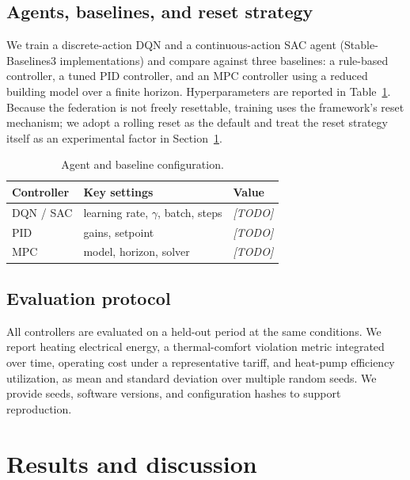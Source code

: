\documentclass[preprint,review,12pt]{elsarticle}
\begin{document}
\subsection{Agents, baselines, and reset strategy}
We train a discrete-action DQN and a continuous-action SAC agent (Stable-Baselines3
implementations) and compare against three baselines: a rule-based controller, a
tuned PID controller, and an MPC controller using a reduced building model over a
finite horizon. Hyperparameters are reported in Table~\ref{tab:hparams}. Because
the federation is not freely resettable, training uses the framework's reset
mechanism; we adopt a rolling reset as the default and treat the reset strategy
itself as an experimental factor in Section~\ref{sec:results}.

\begin{table}[t]\centering
\caption{Agent and baseline configuration.}
\label{tab:hparams}
\small
\begin{tabular}{@{}lll@{}}
\toprule
Controller & Key settings & Value \\
\midrule
DQN / SAC & learning rate, $\gamma$, batch, steps & \textit{[TODO]} \\
PID       & gains, setpoint & \textit{[TODO]} \\
MPC       & model, horizon, solver & \textit{[TODO]} \\
\bottomrule
\end{tabular}
\end{table}

\subsection{Evaluation protocol}
All controllers are evaluated on a held-out period at the same conditions. We
report heating electrical energy, a thermal-comfort violation metric integrated
over time, operating cost under a representative tariff, and heat-pump efficiency
utilization, as mean and standard deviation over multiple random seeds. We provide
seeds, software versions, and configuration hashes to support reproduction.

\section{Results and discussion}\label{sec:results}
\end{document}
